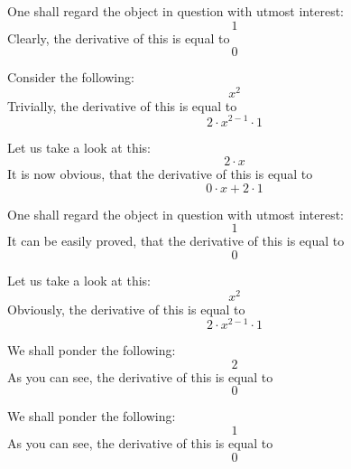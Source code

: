 \documentclass{article}
\begin{document}
One shall regard the object in question with utmost interest:
\begin{equation}
1 
\end{equation}
Clearly, the derivative of this is equal to
\begin{equation}
0 
\end{equation}

Consider the following:
\begin{equation}
x ^{2 } 
\end{equation}
Trivially, the derivative of this is equal to
\begin{equation}
2 \cdot x ^{2 - 1 } \cdot 1 
\end{equation}

Let us take a look at this:
\begin{equation}
2 \cdot x 
\end{equation}
It is now obvious, that the derivative of this is equal to
\begin{equation}
0 \cdot x + 2 \cdot 1 
\end{equation}

One shall regard the object in question with utmost interest:
\begin{equation}
1 
\end{equation}
It can be easily proved, that the derivative of this is equal to
\begin{equation}
0 
\end{equation}

Let us take a look at this:
\begin{equation}
x ^{2 } 
\end{equation}
Obviously, the derivative of this is equal to
\begin{equation}
2 \cdot x ^{2 - 1 } \cdot 1 
\end{equation}

We shall ponder the following:
\begin{equation}
2 
\end{equation}
As you can see, the derivative of this is equal to
\begin{equation}
0 
\end{equation}

We shall ponder the following:
\begin{equation}
1 
\end{equation}
As you can see, the derivative of this is equal to
\begin{equation}
0 
\end{equation}
\end{document}
